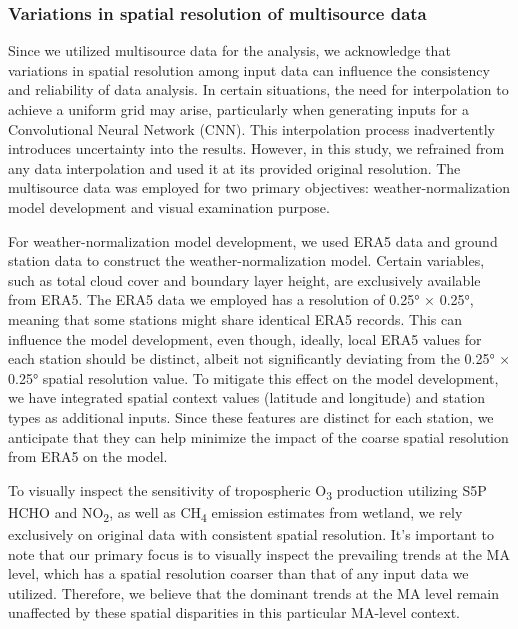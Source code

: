 \subsubsection{Variations in spatial resolution of multisource data}
Since we utilized multisource data for the analysis, we acknowledge that variations in spatial resolution among input data can influence the consistency and reliability of data analysis. In certain situations, the need for interpolation to achieve a uniform grid may arise, particularly when generating inputs for a Convolutional Neural Network (CNN). This interpolation process inadvertently introduces uncertainty into the results.  However, in this study, we refrained from any data interpolation and used it at its provided original resolution. The multisource data was employed for two primary objectives: weather-normalization model development and visual examination purpose. \par
For weather-normalization model development, we used ERA5 data and ground station data to construct the weather-normalization model. Certain variables, such as total cloud cover and boundary layer height, are exclusively available from ERA5. The ERA5 data we employed has a resolution of 0.25° × 0.25°, meaning that some stations might share identical ERA5 records. This can influence the model development, even though, ideally, local ERA5 values for each station should be distinct, albeit not significantly deviating from the 0.25° × 0.25° spatial resolution value. To mitigate this effect on the model development, we have integrated spatial context values (latitude and longitude) and station types as additional inputs. Since these features are distinct for each station, we anticipate that they can help minimize the impact of the coarse spatial resolution from ERA5 on the model. \par
To visually inspect the sensitivity of tropospheric O\textsubscript{3} production utilizing S5P HCHO and NO\textsubscript{2}, as well as CH\textsubscript{4} emission estimates from wetland, we rely exclusively on original data with consistent spatial resolution. It's important to note that our primary focus is to visually inspect the prevailing trends at the MA level, which has a spatial resolution coarser than that of any input data we utilized. Therefore, we believe that the dominant trends at the MA level remain unaffected by these spatial disparities in this particular MA-level context. \par

